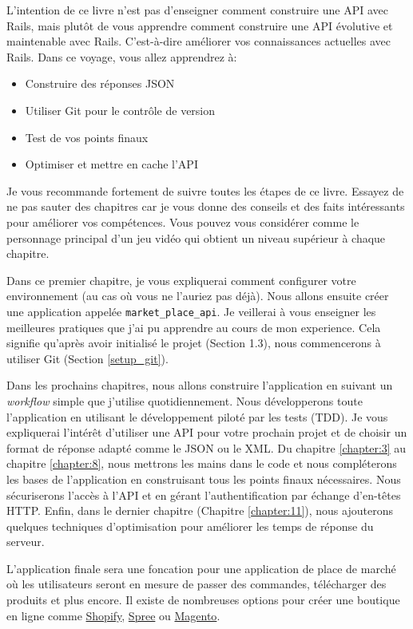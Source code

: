\documentclass[]{report}
\begin{document}
  L'intention de ce livre n'est pas d'enseigner comment construire une API avec Rails, mais plutôt de vous apprendre comment construire une API évolutive et maintenable avec Rails. C'est-à-dire améliorer vos connaissances actuelles avec Rails. Dans ce voyage, vous allez apprendrez à:

  \begin{itemize}
    \item Construire des réponses JSON
    \item Utiliser Git pour le contrôle de version
    \item Test de vos points finaux
    \item Optimiser et mettre en cache l'API
  \end{itemize}

  Je vous recommande fortement de suivre toutes les étapes de ce livre. Essayez de ne pas sauter des chapitres car je vous donne des conseils et des faits intéressants pour améliorer vos compétences. Vous pouvez vous considérer comme le personnage principal d'un jeu vidéo qui obtient un niveau supérieur à chaque chapitre.

  Dans ce premier chapitre, je vous expliquerai comment configurer votre environnement (au cas où vous ne l'auriez pas déjà). Nous allons ensuite créer une application appelée \verb|market_place_api|. Je veillerai à vous enseigner les meilleures pratiques que j'ai pu apprendre au cours de mon experience. Cela signifie qu'après avoir initialisé le projet (Section 1.3), nous commencerons à utiliser Git (Section \ref{setup_git}).

  Dans les prochains chapitres, nous allons construire l'application en suivant un \textit{workflow} simple que j'utilise quotidiennement. Nous développerons toute l'application en utilisant le développement piloté par les tests (TDD). Je vous expliquerai l’intérêt d'utiliser une API pour votre prochain projet et de choisir un format de réponse adapté comme le JSON ou le XML. Du chapitre \ref{chapter:3} au chapitre \ref{chapter:8}, nous mettrons les mains dans le code et nous compléterons les bases de l'application en construisant tous les points finaux nécessaires. Nous sécuriserons l'accès à l'API et en gérant l'authentification par échange d'en-têtes HTTP. Enfin, dans le dernier chapitre (Chapitre \ref{chapter:11}), nous ajouterons quelques techniques d'optimisation pour améliorer les temps de réponse du serveur.

  L'application finale sera une foncation pour une application de place de marché où les utilisateurs seront en mesure de passer des commandes, télécharger des produits et plus encore. Il existe de nombreuses options pour créer une boutique en ligne comme \href{http://shopify.com/}{Shopify}, \href{http://spreecommerce.com/}{Spree} ou \href{http://magento.com/}{Magento}.
\end{document}
